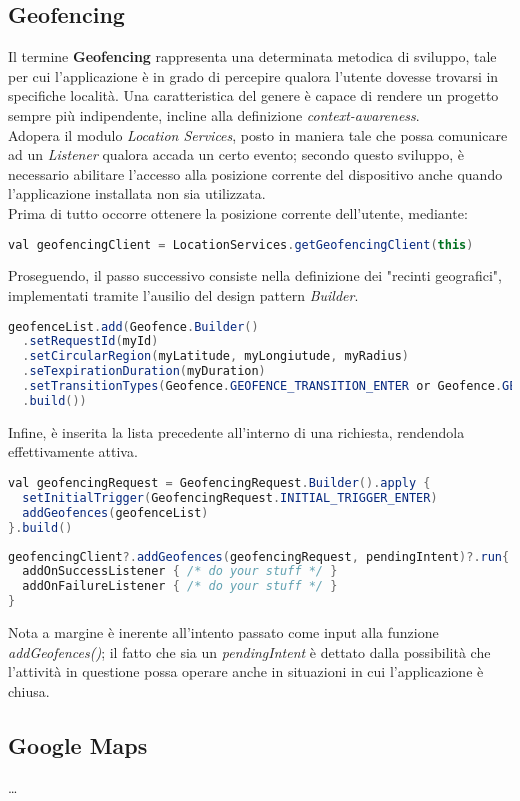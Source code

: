 \documentclass{article}
\begin{document}
\subsection*{Geofencing}
Il termine \textbf{Geofencing} rappresenta una determinata metodica di sviluppo, tale per cui l'applicazione è in grado di percepire qualora l'utente dovesse trovarsi in specifiche località. Una caratteristica del genere è capace di rendere un progetto sempre più indipendente, incline alla definizione \textit{context-awareness}.\vspace*{7pt}\\
Adopera il modulo \textit{Location Services}, posto in maniera tale che possa comunicare ad un \textit{Listener} qualora accada un certo evento; secondo questo sviluppo, è necessario abilitare l'accesso alla posizione corrente del dispositivo anche quando l'applicazione installata non sia utilizzata.\vspace*{7pt}\\
Prima di tutto occorre ottenere la posizione corrente dell'utente, mediante:
\begin{lstlisting}[language=JAVA]
val geofencingClient = LocationServices.getGeofencingClient(this)
\end{lstlisting}
Proseguendo, il passo successivo consiste nella definizione dei "recinti geografici", implementati tramite l'ausilio del design pattern \textit{Builder}.
\begin{lstlisting}[language=JAVA]
geofenceList.add(Geofence.Builder()
  .setRequestId(myId)
  .setCircularRegion(myLatitude, myLongiutude, myRadius)
  .seTexpirationDuration(myDuration)  
  .setTransitionTypes(Geofence.GEOFENCE_TRANSITION_ENTER or Geofence.GEOFENCE_TRANSITION_EXIT)
  .build())
\end{lstlisting}
Infine, è inserita la lista precedente all'interno di una richiesta, rendendola effettivamente attiva.
\begin{lstlisting}[language=JAVA]
val geofencingRequest = GeofencingRequest.Builder().apply {
  setInitialTrigger(GeofencingRequest.INITIAL_TRIGGER_ENTER)
  addGeofences(geofenceList)
}.build()
\end{lstlisting}
\begin{lstlisting}[language=JAVA]
geofencingClient?.addGeofences(geofencingRequest, pendingIntent)?.run{
  addOnSuccessListener { /* do your stuff */ }
  addOnFailureListener { /* do your stuff */ } 
}
\end{lstlisting}
Nota a margine è inerente all'intento passato come input alla funzione \textit{addGeofences()}; il fatto che sia un \textit{pendingIntent} è dettato dalla possibilità che l'attività in questione possa operare anche in situazioni in cui l'applicazione è chiusa. 

\subsection*{Google Maps}
\dots
\end{document}
